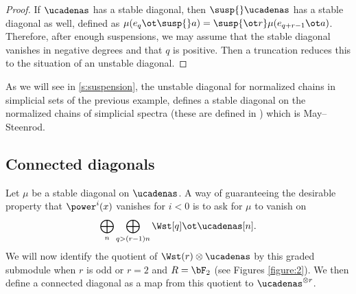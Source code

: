 \begin{proof}
	If $\ucadenas$ has a stable diagonal, then $\susp{} \ucadenas$ has a stable diagonal as well, defined as $\mu(e_q \ot \susp{} a) = \susp{\ot r}\mu(e_{q+r-1} \ot a)$.
	Therefore, after enough suspensions, we may assume that the stable diagonal vanishes in negative degrees and that $q$ is positive.
	Then a truncation reduces this to the situation of an unstable diagonal.
\end{proof}

\begin{example}
	As we will see in \cref{s:suspension}, the unstable diagonal for normalized chains in simplicial sets of the previous example, defines a stable diagonal on the normalized chains of simplicial spectra (these are defined in \cite{Gill2020}) which is May--Steenrod.
\end{example}



\subsection{Connected diagonals}\label{s:connected}

Let $\mu$ be a stable diagonal on $\ucadenas$.
A way of guaranteeing the desirable property that $\power^i(x)$ vanishes for $i<0$ is to ask for $\mu$ to vanish on
	\[
	\bigoplus_n\bigoplus_{q>(r-1)n}\Wst[q] \ot \ucadenas[n].
	\]
We will now identify the quotient of $\Wst(r)\otimes \ucadenas$ by this graded submodule when $r$ is odd or $r=2$ and $R=\bF_2$ (see Figures \ref{figure:2}). We then define a connected diagonal as a map from this quotient to $\ucadenas^{\otimes r}$.



